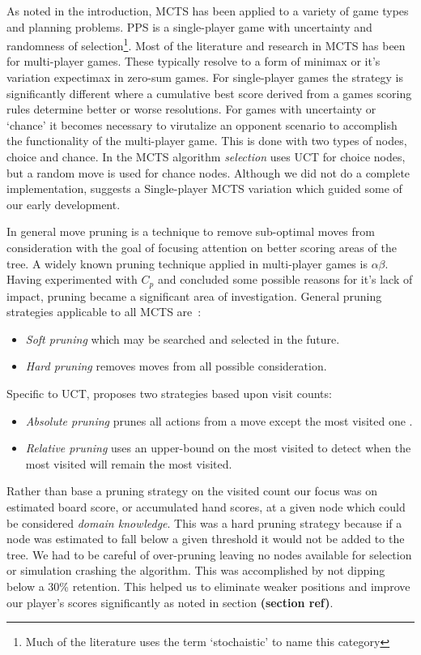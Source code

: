 \documentclass[letterpaper]{article}
\begin{document}
As noted in the introduction, MCTS has been applied to a variety of game types and planning problems. PPS is a single-player game with uncertainty and randomness of selection\footnote{Much of the literature uses the term `stochaistic' to name this category}. Most of the literature and research in MCTS has been for multi-player games. These typically resolve to a form of minimax or it's variation expectimax in zero-sum games. For single-player games the strategy is significantly different where a cumulative best score derived from a games scoring rules determine better or worse resolutions. For games with uncertainty or `chance' it becomes necessary to virutalize an opponent scenario to accomplish the functionality of the multi-player game. This is done with two types of nodes, choice and chance. In the MCTS algorithm \emph{selection} uses UCT for choice nodes, but a random move is used for chance nodes. Although we did not do a complete implementation, \cite{schadd2012single} suggests a Single-player MCTS variation which guided some of our early development.

In general move pruning is a technique to remove sub-optimal moves from consideration with the goal of focusing attention on better scoring areas of the tree. A widely known pruning technique applied in multi-player games is $\alpha\beta$. Having experimented with $C_p$ and concluded some possible reasons for it's lack of impact, pruning became a significant area of investigation. General pruning strategies applicable to all MCTS are~\cite{browne2010monte}:
\begin{itemize}
\item \emph{Soft pruning} which may be searched and selected in the future.
\item \emph{Hard pruning} removes moves from all possible consideration.
\end{itemize}
Specific to UCT, \cite{huang2010pruning} proposes two strategies based upon visit counts:
\begin{itemize}
\item \emph{Absolute pruning} prunes all actions from a move except the most visited one .
\item \emph{Relative pruning} uses an upper-bound on the most visited to detect when the most visited will remain the most visited.
\end{itemize}

Rather than base a pruning strategy on the visited count our focus was on estimated board score, or accumulated hand scores, at a given node which could be considered \emph{domain knowledge}. This was a hard pruning strategy because if a node was estimated to fall below a given threshold it would not be added to the tree. We had to be careful of over-pruning leaving no nodes available for selection or simulation crashing the algorithm. This was accomplished by not dipping below a 30\% retention. This helped us to eliminate weaker positions and improve our player's scores significantly as noted in section {\bf(section ref)}.
\end{document}
